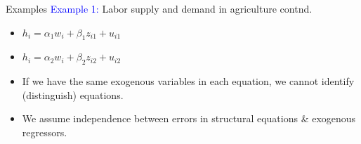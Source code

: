 \documentclass[usenames,dvipsnames]{beamer}
\begin{document}
\begin{frame}{Examples}
\textcolor{Blue}{Example 1:} Labor supply and demand in agriculture contnd.\\
\bigskip
\begin{itemize}
\item [] $h_i  = \alpha_1 w_i + \beta_1 z_{i1} + u_{i1}$
\item [] $h_i  = \alpha_2 w_i + \beta_2 z_{i2} + u_{i2}$ \\
\medskip
\item If we have the same exogenous variables in each equation, we cannot identify (distinguish) equations. \\
\medskip
\item We assume independence between errors in structural equations \& exogenous regressors. 
\end{itemize}
\end{frame}
\end{document}
